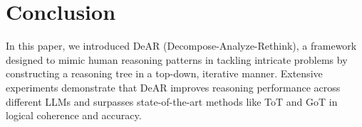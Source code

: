 \documentclass{article}
\begin{document}
\section{Conclusion}
In this paper, we introduced DeAR (Decompose-Analyze-Rethink), a framework designed to mimic human reasoning patterns in tackling intricate problems by constructing a reasoning tree in a top-down, iterative manner. Extensive experiments demonstrate that DeAR improves reasoning performance across different LLMs and surpasses state-of-the-art methods like ToT and GoT in logical coherence and accuracy.
\end{document}
